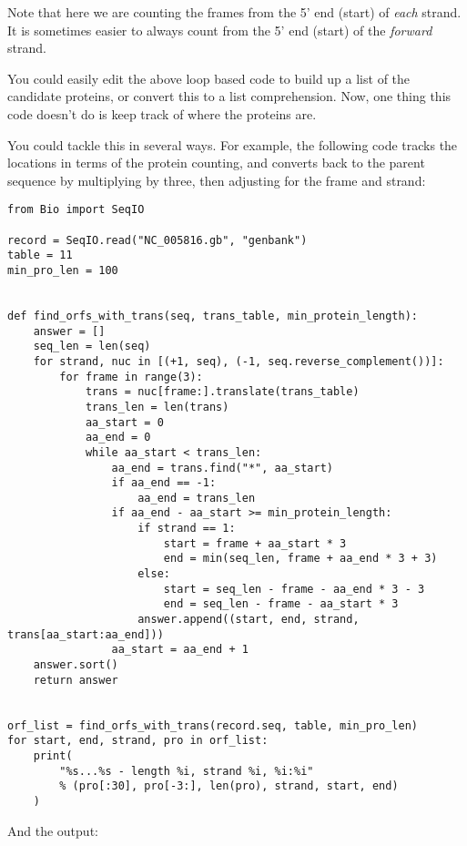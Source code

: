 Note that here we are counting the frames from the 5' end (start) of
\emph{each} strand. It is sometimes easier to always count from the 5' end
(start) of the \emph{forward} strand.

You could easily edit the above loop based code to build up a list of the
candidate proteins, or convert this to a list comprehension.  Now, one thing
this code doesn't do is keep track of where the proteins are.

You could tackle this in several ways.  For example, the following code tracks
the locations in terms of the protein counting, and converts back to the
parent sequence by multiplying by three, then adjusting for the frame and
strand:

\begin{verbatim}
from Bio import SeqIO

record = SeqIO.read("NC_005816.gb", "genbank")
table = 11
min_pro_len = 100


def find_orfs_with_trans(seq, trans_table, min_protein_length):
    answer = []
    seq_len = len(seq)
    for strand, nuc in [(+1, seq), (-1, seq.reverse_complement())]:
        for frame in range(3):
            trans = nuc[frame:].translate(trans_table)
            trans_len = len(trans)
            aa_start = 0
            aa_end = 0
            while aa_start < trans_len:
                aa_end = trans.find("*", aa_start)
                if aa_end == -1:
                    aa_end = trans_len
                if aa_end - aa_start >= min_protein_length:
                    if strand == 1:
                        start = frame + aa_start * 3
                        end = min(seq_len, frame + aa_end * 3 + 3)
                    else:
                        start = seq_len - frame - aa_end * 3 - 3
                        end = seq_len - frame - aa_start * 3
                    answer.append((start, end, strand, trans[aa_start:aa_end]))
                aa_start = aa_end + 1
    answer.sort()
    return answer


orf_list = find_orfs_with_trans(record.seq, table, min_pro_len)
for start, end, strand, pro in orf_list:
    print(
        "%s...%s - length %i, strand %i, %i:%i"
        % (pro[:30], pro[-3:], len(pro), strand, start, end)
    )
\end{verbatim}

\noindent And the output:

